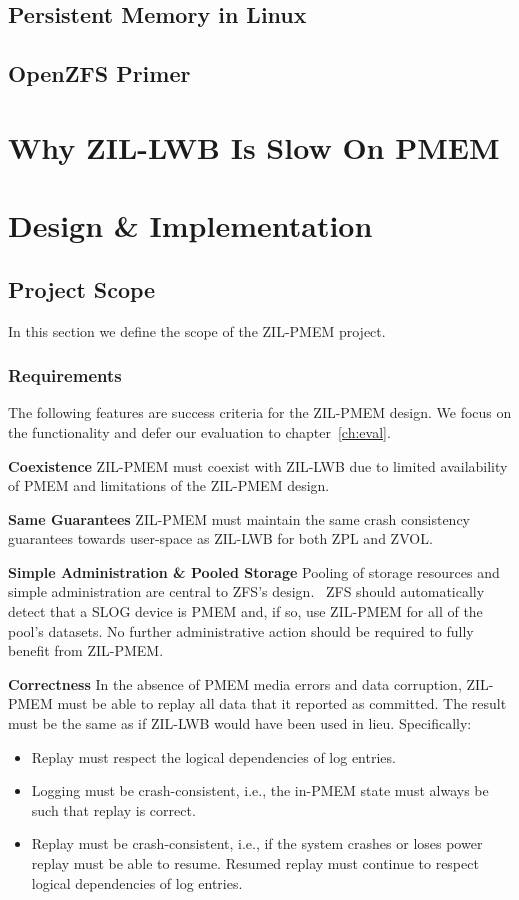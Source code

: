 \documentclass[12pt,a4paper,twoside,draft]{book}
\begin{document}
\section{Persistent Memory in Linux}
\section{OpenZFS Primer}

\chapter{Why ZIL-LWB Is Slow On PMEM}\label{ch:lwb_analysis}

\chapter{Design \& Implementation}

\section{Project Scope}
In this section we define the scope of the ZIL-PMEM project.

\newcommand{\csgoal}[1]{\textbf{#1}}

\subsection{Requirements}
The following features are success criteria for the ZIL-PMEM design.
We focus on the functionality and defer our evaluation to chapter~\ref{ch:eval}.

\csgoal{Coexistence}
ZIL-PMEM must coexist with ZIL-LWB due to limited availability of PMEM and limitations of the ZIL-PMEM design.

\csgoal{Same Guarantees}
ZIL-PMEM must maintain the same crash consistency guarantees towards user-space as ZIL-LWB for both ZPL and ZVOL.

\csgoal{Simple Administration \& Pooled Storage}
Pooling of storage resources and simple administration are central to ZFS's design.~\cite{zfspaper}
ZFS should automatically detect that a SLOG device is PMEM and, if so, use ZIL-PMEM for all of the pool’s datasets.
No further administrative action should be required to fully benefit from ZIL-PMEM.

\csgoal{Correctness}
In the absence of PMEM media errors and data corruption, ZIL-PMEM must be able to replay all data that it reported as committed.
The result must be the same as if ZIL-LWB would have been used in lieu.
Specifically:
\begin{itemize}[noitemsep,beginpenalty=100000,midpenalty=100000]
    \item Replay must respect the logical dependencies of log entries.
    \item Logging must be crash-consistent, i.e., the in-PMEM state must always be such that replay is correct.
    \item Replay must be crash-consistent, i.e., if the system crashes or loses power replay must be able to resume. Resumed replay must continue to respect logical dependencies of log entries.
\end{itemize}
\end{document}
